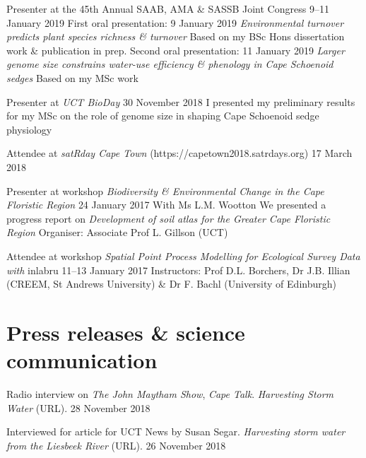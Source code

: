 \documentclass[10pt]{article}
\begin{document}
\begin{hangparas}{2em}{1}

Presenter at the 45th Annual SAAB, AMA \& SASSB Joint Congress
                                       \hfill {\small 9--11 January 2019} \break
First oral presentation:                   \hfill {\small 9 January 2019} \break
\textit{Environmental turnover predicts plant species richness \& turnover}
\break
Based on my BSc Hons dissertation work \& publication in prep. \break
Second oral presentation:                 \hfill {\small 11 January 2019} \break
\textit{Larger genome size constrains water-use efficiency \& phenology in 
Cape Schoenoid sedges} \break
Based on my MSc work

Presenter at \textit{UCT BioDay}         \hfill {\small 30 November 2018} \break
I presented my preliminary results for my MSc on the role of genome size in 
shaping Cape Schoenoid sedge physiology

Attendee at \textit{satRday Cape Town} (https://capetown2018.satrdays.org)
                                                   \hfill {\small 17 March 2018}

Presenter at workshop \textit{Biodiversity \& Environmental Change in the Cape 
Floristic Region}                         \hfill {\small 24 January 2017} \break
With Ms L.M. Wootton \break
We presented a progress report on \textit{Development of soil atlas for the 
Greater Cape Floristic Region} \break
Organiser: Associate Prof L. Gillson (UCT)

Attendee at workshop \textit{Spatial Point Process Modelling for Ecological 
Survey Data with} inlabru             \hfill {\small 11--13 January 2017} \break
Instructors: Prof D.L. Borchers, Dr J.B. Illian (CREEM, St Andrews University) 
\& Dr F. Bachl (University of Edinburgh)

\hfill

\end{hangparas}

\section*{Press releases \& science communication} %

Radio interview on \textit{The John Maytham Show}, \textit{Cape Talk}.
\textit{Harvesting Storm Water} (URL).                   \hfill 28 November 2018

Interviewed for article for UCT News by Susan Segar. \textit{Harvesting storm 
water from the Liesbeek River} (URL).                    \hfill 26 November 2018
\end{document}
